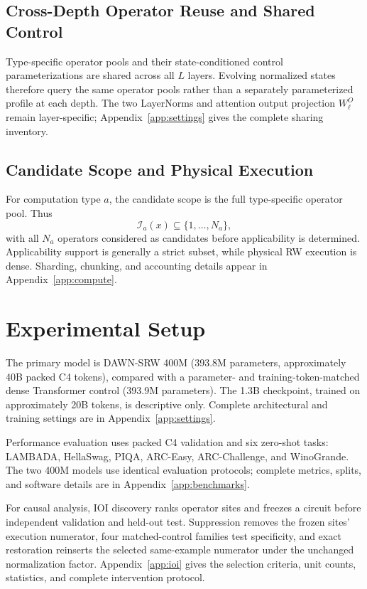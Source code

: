 \documentclass{article}
\newcommand{\DAWN}{DAWN-SRW}
\begin{document}
\subsection{Cross-Depth Operator Reuse and Shared Control}
\label{sec:reuse}

Type-specific operator pools and their state-conditioned control parameterizations
are shared across all \(L\) layers. Evolving normalized states therefore query
the same operator pools rather than a separately parameterized profile at each
depth. The two
LayerNorms and attention output projection \(W^O_\ell\) remain layer-specific;
Appendix~\ref{app:settings} gives the complete sharing inventory.

\subsection{Candidate Scope and Physical Execution}
\label{sec:candidate-execution}

For computation type \(a\), the candidate scope is the full type-specific
operator pool. Thus
\[
\mathcal{I}_a(x)\subseteq\{1,\ldots,N_a\},
\]
with all \(N_a\) operators considered as candidates before applicability is
determined. Applicability support is generally a strict subset, while physical
RW execution is dense. Sharding, chunking, and accounting details appear in
Appendix~\ref{app:compute}.

\section{Experimental Setup}
\label{sec:setup}
\label{sec:protocol}

The primary model is \DAWN{} 400M (393.8M parameters, approximately 40B packed
C4 tokens), compared with a parameter- and training-token-matched dense
Transformer control (393.9M parameters). The 1.3B checkpoint, trained on approximately 20B
tokens, is descriptive only. Complete
architectural and training settings are in Appendix~\ref{app:settings}.

Performance evaluation uses packed C4 validation and six zero-shot tasks:
LAMBADA, HellaSwag, PIQA, ARC-Easy, ARC-Challenge, and WinoGrande. The two 400M
models use identical evaluation protocols; complete metrics, splits, and software
details are in Appendix~\ref{app:benchmarks}.

For causal analysis, IOI discovery ranks operator sites and freezes a circuit
before independent validation and held-out test. Suppression removes the frozen
sites' execution numerator, four matched-control families test specificity, and
exact restoration reinserts the selected same-example numerator under the
unchanged normalization factor. Appendix~\ref{app:ioi} gives the selection criteria, unit
counts, statistics, and complete intervention protocol.
\end{document}
